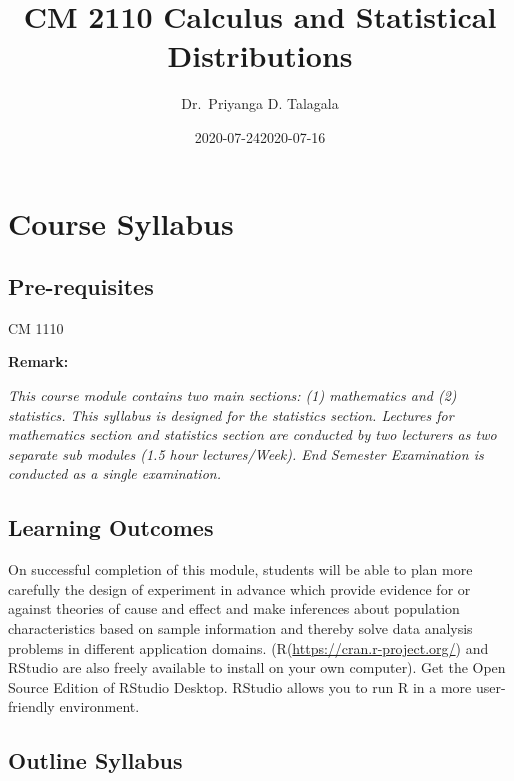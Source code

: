 \documentclass[]{book}
\title{CM 2110 Calculus and Statistical Distributions}
\author{Dr.~Priyanga D. Talagala}
\date{2020-07-24}
\date{2020-07-16}
\begin{document}
\maketitle

{
\setcounter{tocdepth}{1}
\tableofcontents
}
\hypertarget{course-syllabus}{%
\chapter*{Course Syllabus}\label{course-syllabus}}

\hypertarget{pre-requisites}{%
\section*{Pre-requisites}\label{pre-requisites}}

CM 1110

\textbf{Remark:}

\emph{This course module contains two main sections: (1) mathematics and (2) statistics. This syllabus is designed for the statistics section. Lectures for mathematics section and statistics section are conducted by two lecturers as two separate sub modules (1.5 hour lectures/Week). End Semester Examination is conducted as a single examination.}

\hypertarget{learning-outcomes}{%
\section*{Learning Outcomes}\label{learning-outcomes}}

On successful completion of this module, students will be able to plan more carefully the design of experiment in advance which provide evidence for or against theories of cause and effect and make inferences about population characteristics based on sample information and thereby solve data analysis problems in different application domains. (R(\url{https://cran.r-project.org/}) and RStudio are also freely available to install on your own computer). Get the Open Source Edition of RStudio Desktop. RStudio allows you to run R in a more user-friendly environment.

\hypertarget{outline-syllabus}{%
\section*{Outline Syllabus}\label{outline-syllabus}}
\end{document}
